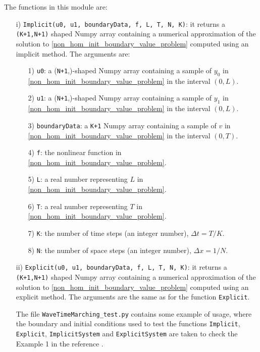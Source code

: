 \documentclass{amsart}
\theoremstyle{plain}
\theoremstyle{definition}
\theoremstyle{remark}
\numberwithin{equation}{section}
\begin{document}
The functions in this module are:
\begin{itemize}
\item[i)] \verb|Implicit(u0, u1, boundaryData, f, L, T, N, K)|: it returns a \verb|(K+1,N+1)| shaped Numpy array
containing  a numerical approximation of the solution to \eqref{non_hom_init_boundary_value_problem} computed using an implicit method.
The arguments are:
\begin{itemize}
\item[1)] \verb|u0|: a (\verb|N+1|,)-shaped Numpy array containing a sample of $y_0$ in  \eqref{non_hom_init_boundary_value_problem} in the interval $(0,L)$.
\item[2)] \verb|u1|: a (\verb|N+1|,)-shaped Numpy array containing a sample of $y_1$ in  \eqref{non_hom_init_boundary_value_problem} in the interval $(0,L)$.
\item[3)] \verb|boundaryData|: a \verb|K+1| Numpy array containing a sample of $v$ in \eqref{non_hom_init_boundary_value_problem} in the interval $(0,T)$.
\item[4)] \verb|f|: the nonlinear function in \eqref{non_hom_init_boundary_value_problem}.
\item[5)] \verb|L|: a real number representing $L$ in \eqref{non_hom_init_boundary_value_problem}.
\item[6)] \verb|T|: a real number representing $T$ in \eqref{non_hom_init_boundary_value_problem}.
\item[7)] \verb|K|: the number of time steps (an integer number), $\Delta t= T/K$.
\item[8)] \verb|N|: the number of space steps (an integer number), $\Delta x = 1/N$.
\end{itemize}
\item[ii)] \verb|Explicit(u0, u1, boundaryData, f, L, T, N, K)|: it returns a \verb|(K+1,N+1)| shaped Numpy array containing  a numerical approximation of the solution to \eqref{non_hom_init_boundary_value_problem} computed using an explicit method. The arguments are the same as for the function \verb|Explicit|.



The file \verb|WaveTimeMarching_test.py| contains some example of usage, where the boundary
and initial conditions used to test the functions \verb|Implicit|, \verb|Explicit|,
\verb|ImplicitSystem| and \verb|ExplicitSystem| are taken to check the Example 1 in the reference \cite{CindeaMunch}.


\end{itemize}
\end{document}
